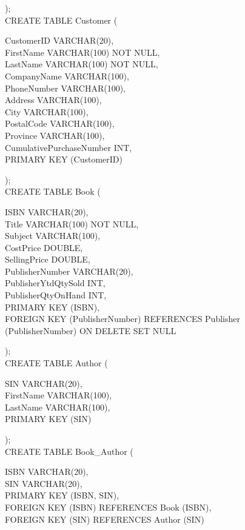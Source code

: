 \documentclass{scrreprt}
\begin{document}
);\\
CREATE TABLE Customer
(
\begin{adjustwidth}{1cm}{0cm}
    CustomerID               VARCHAR(20),\\
    FirstName                VARCHAR(100) NOT NULL,\\
    LastName                 VARCHAR(100) NOT NULL,\\
    CompanyName              VARCHAR(100),\\
    PhoneNumber              VARCHAR(100),\\
    Address                  VARCHAR(100),\\
    City                     VARCHAR(100),\\
    PostalCode               VARCHAR(100),\\
    Province                 VARCHAR(100),\\
    CumulativePurchaseNumber INT,\\
    PRIMARY KEY (CustomerID)
\end{adjustwidth}
);\\
CREATE TABLE Book
(
\begin{adjustwidth}{1cm}{0cm}
    ISBN                VARCHAR(20),\\
    Title               VARCHAR(100) NOT NULL,\\
    Subject             VARCHAR(100),\\
    CostPrice           DOUBLE,\\
    SellingPrice        DOUBLE,\\
    PublisherNumber     VARCHAR(20),\\
    PublisherYtdQtySold INT,\\
    PublisherQtyOnHand  INT,\\
    PRIMARY KEY (ISBN),\\
    FOREIGN KEY (PublisherNumber) REFERENCES Publisher (PublisherNumber)
        ON DELETE SET NULL
\end{adjustwidth}
);\\
CREATE TABLE Author
(
\begin{adjustwidth}{1cm}{0cm}
    SIN       VARCHAR(20),\\
    FirstName VARCHAR(100),\\
    LastName  VARCHAR(100),\\
    PRIMARY KEY (SIN)
\end{adjustwidth}
);\\
CREATE TABLE Book_Author
(
\begin{adjustwidth}{1cm}{0cm}
    ISBN VARCHAR(20),\\
    SIN  VARCHAR(20),\\
    PRIMARY KEY (ISBN, SIN),\\
    FOREIGN KEY (ISBN) REFERENCES Book (ISBN),\\
    FOREIGN KEY (SIN) REFERENCES Author (SIN)
\end{adjustwidth}
\end{document}
